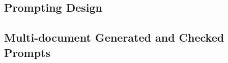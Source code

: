 \documentclass[doublespace,nopageskip]{VTthesis}
\begin{document}
	\appendix

	\begin{appendices}
		\chapter{Prompting Design} \label{app:prompt}
			\section{Multi-document Generated and Checked Prompts} \label{ase:app_prompt_llama2}
                
	\end{appendices}
\end{document}
